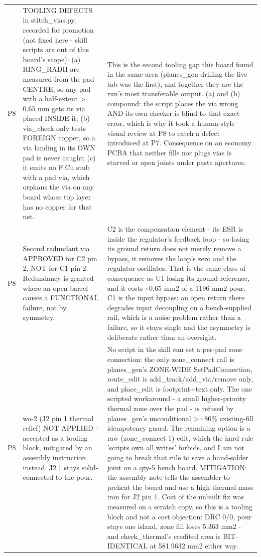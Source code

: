\documentclass[11pt,a4paper]{article}
\begin{document}
{\begin{longtable}{lp{5.2cm}p{7.2cm}}
P8 & TOOLING DEFECTS in stitch\_vias.py, recorded for promotion (not fixed here - skill scripts are out of this board's scope): (a) RING\_RADII are measured from the pad CENTRE, so any pad with a half-extent \textgreater{} 0.65 mm gets its via placed INSIDE it; (b) via\_check only tests FOREIGN copper, so a via landing in its OWN pad is never caught; (c) it emits no F.Cu stub with a pad via, which orphans the via on any board whose top layer has no copper for that net. & This is the second tooling gap this board found in the same area (planes\_gen drilling the live tab was the first), and together they are the run's most transferable output. (a) and (b) compound: the script places the via wrong AND its own checker is blind to that exact error, which is why it took a human-style visual review at P8 to catch a defect introduced at P7. Consequence on an economy PCBA that neither fills nor plugs vias is starved or open joints under paste apertures. \\
P8 & Second redundant via APPROVED for C2 pin 2, NOT for C1 pin 2. Redundancy is granted where an open barrel causes a FUNCTIONAL failure, not by symmetry. & C2 is the compensation element - its ESR is inside the regulator's feedback loop - so losing its ground return does not merely remove a bypass, it removes the loop's zero and the regulator oscillates. That is the same class of consequence as U1 losing its ground reference, and it costs \textasciitilde{}0.65 mm2 of a 1196 mm2 pour. C1 is the input bypass: an open return there degrades input decoupling on a bench-supplied rail, which is a noise problem rather than a failure, so it stays single and the asymmetry is deliberate rather than an oversight. \\
P8 & wo-2 (J2 pin 1 thermal relief) NOT APPLIED - accepted as a tooling block, mitigated by an assembly instruction instead. J2.1 stays solid-connected to the pour. & No script in the skill can set a per-pad zone connection: the only zone\_connect call is planes\_gen's ZONE-WIDE SetPadConnection, route\_edit is add\_track/add\_via/remove only, and place\_edit is footprint+text only. The one scripted workaround - a small higher-priority thermal zone over the pad - is refused by planes\_gen's unconditional \textgreater{}=80\% existing-fill idempotency guard. The remaining option is a raw (zone\_connect 1) edit, which the hard rule 'scripts own all writes' forbids, and I am not going to break that rule to save a hand-solder joint on a qty-5 bench board. MITIGATION: the assembly note tells the assembler to preheat the board and use a high-thermal-mass iron for J2 pin 1. Cost of the unbuilt fix was measured on a scratch copy, so this is a tooling block and not a cost objection: DRC 0/0, pour stays one island, zone fill loses 5.363 mm2 - and check\_thermal's credited area is BIT-IDENTICAL at 581.9632 mm2 either way. \\

\end{longtable}}
\end{document}
